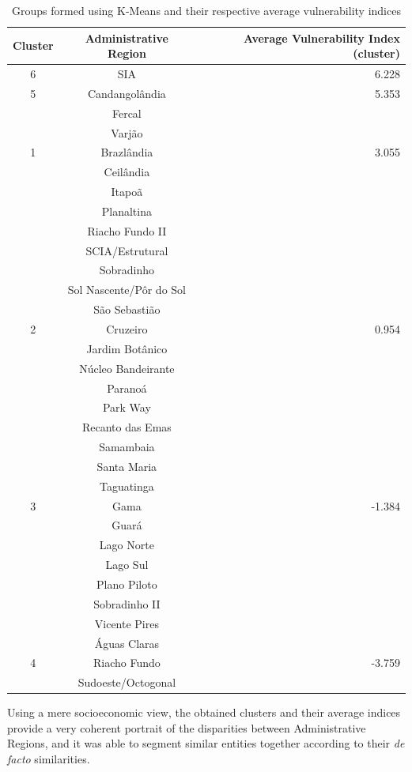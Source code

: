 \documentclass[conference]{IEEEtran}
\begin{document}
\begin{table}[H]
\centering
\begin{tabular}{|c|c|r|}
\hline
\textbf{Cluster} & \textbf{Administrative Region} & \textbf{Average Vulnerability Index (cluster)} \\
\hline
6 & SIA & 6.228 \\
\hline
5 & Candangolândia & 5.353 \\
 & Fercal &  \\
 & Varjão &  \\
\hline
1 & Brazlândia & 3.055 \\
 & Ceilândia &  \\
 & Itapoã &  \\
 & Planaltina &  \\
 & Riacho Fundo II &  \\
 & SCIA/Estrutural &  \\
 & Sobradinho &  \\
 & Sol Nascente/Pôr do Sol &  \\
 & São Sebastião &  \\
\hline
2 & Cruzeiro & 0.954 \\
 & Jardim Botânico &  \\
 & Núcleo Bandeirante &  \\
 & Paranoá &  \\
 & Park Way &  \\
 & Recanto das Emas &  \\
 & Samambaia &  \\
 & Santa Maria &  \\
 & Taguatinga &  \\
\hline
3 & Gama & -1.384 \\
 & Guará &  \\
 & Lago Norte &  \\
 & Lago Sul &  \\
 & Plano Piloto &  \\
 & Sobradinho II &  \\
 & Vicente Pires &  \\
 & Águas Claras &  \\
\hline
4 & Riacho Fundo & -3.759 \\
 & Sudoeste/Octogonal &  \\
\hline
\end{tabular}
\caption{Groups formed using K-Means and their respective average vulnerability indices}
\label{tab:cidades-cluster}
\end{table}


Using a mere socioeconomic view, the obtained clusters and their average indices provide a very coherent portrait of the disparities between Administrative Regions, and it was able to segment similar entities together according to their \textit{de facto} similarities. 
\end{document}
